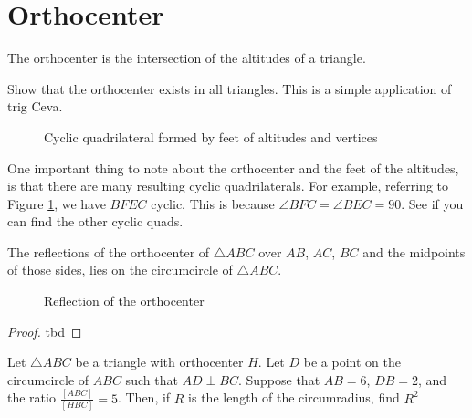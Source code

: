 \documentclass[11pt]{scrartcl}
\theoremstyle{plain}
\begin{document}
\section{Orthocenter}

    \begin{definition}
        The orthocenter is the intersection of the altitudes of a triangle.
   \end{definition} 

\begin{exercise}
    Show that the orthocenter exists in all triangles. This is a simple application of trig Ceva.
\end{exercise}


\begin{figure}[H]
    \centering
    \scalebox{.75}{}
    \caption{Cyclic quadrilateral formed by feet of altitudes and vertices}
    \label{fig:cyclic_orthocenter}
\end{figure}

One important thing to note about the orthocenter and the feet of the altitudes, is that there are many resulting cyclic quadrilaterals.
For example, referring to Figure \ref{fig:cyclic_orthocenter}, we have $BFEC$ cyclic. This is because $\angle BFC = \angle BEC = 90$.
See if you can find the other cyclic quads.\\
\begin{theorem}\label{reflecting_the_orthocenter}
    The reflections of the orthocenter of $\triangle ABC$ over $AB$, $AC$, $BC$ and the midpoints of those sides, lies on the circumcircle of $\triangle ABC$.
\end{theorem} 
\begin{figure}[H]
    \centering
    \scalebox{.75}{}
    \caption{Reflection of the orthocenter}
    \label{fig:reflection_orthocenter}
\end{figure}
\begin{proof}
    tbd
\end{proof}

\begin{example}[Pumac 2019]
    Let $\triangle ABC$ be a triangle with orthocenter $H$. Let $D$ be a point on the circumcircle
    of $ABC$ such that $AD \perp BC$. Suppose that $AB=6$, $DB=2$, and the ratio $\frac{[ABC]}{[HBC]}=5$. Then, if $R$
    is the length of the circumradius, find $R^2$
\end{example}
\end{document}
